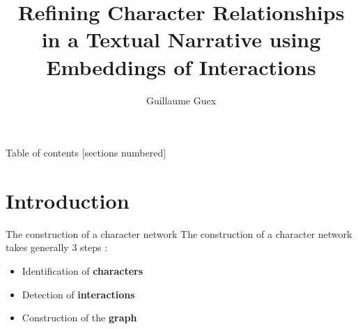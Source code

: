\documentclass[10pt]{beamer}
\title{Refining Character Relationships in a Textual Narrative using Embeddings of Interactions}
\date{}
\author{Guillaume Guex}
\institute{University of Lausanne}
\newcommand{\imp}[1]{\textbf{\color{cyan}#1}}
\begin{document}
	
	
	\maketitle
	
	
	\begin{frame}{Table of contents}
		[sections numbered]
		\tableofcontents%
	\end{frame}

	
	\section[Introduction]{Introduction}
	
	
	\begin{frame}{The construction of a character network}
		The construction of a character network takes generally 3 steps \cite{labatut_extraction_2019}:
		\begin{itemize}
			\item Identification of \imp{characters} 
			\item Detection of \imp{interactions}
			\item Construction of the \imp{graph}
		\end{itemize}
	\end{frame}

	
\end{document}
